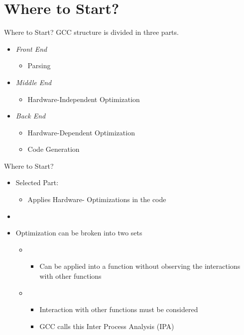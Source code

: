\section{Where to Start?}

\begin{frame}{Where to Start?}
  GCC structure is divided in three parts.
  \begin{itemize}
    \item \textit{Front End}
        \begin{itemize}
            \item Parsing
        \end{itemize}
    \item \textit{Middle End}
        \begin{itemize}
            \item Hardware-Independent Optimization
        \end{itemize}
    \item \textit{Back End}
        \begin{itemize}
            \item Hardware-Dependent Optimization
            \item Code Generation
        \end{itemize}
  \end{itemize}
\end{frame}

\begin{frame}{Where to Start?}
  \begin{itemize}
    \item Selected Part: {\color{blue}{Middle End}}
    \begin{itemize}
        \item Applies Hardware-{\color{blue}{Independent}} Optimizations in the code
    \end{itemize}
    \item[]
    \item Optimization can be broken into two {\color{red}{disjoint}} sets
        \begin{itemize}
            \item {\color{blue}{Intra Procedural}}
                \begin{itemize}
                    \item Can be applied into a function without observing the interactions with other functions
                \end{itemize}
            \item {\color{red}{Inter Procedural}}
                \begin{itemize}
                    \item Interaction with other functions must be considered
                    \item GCC calls this Inter Process Analysis (IPA)
                \end{itemize}
        \end{itemize}
  \end{itemize}
\end{frame}

